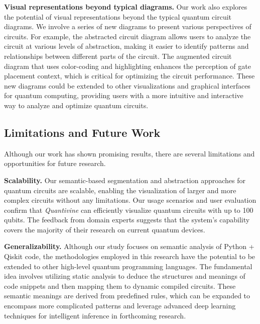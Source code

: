 \textbf{Visual representations beyond typical diagrams.}
Our work also explores the potential of visual representations beyond the typical quantum circuit diagrams.
We involve a series of new diagrams to present various perspectives of circuits.
For example, the abstracted circuit diagram allows users to analyze the circuit at various levels of abstraction, making it easier to identify patterns and relationships between different parts of the circuit.
The augmented circuit diagram that uses color-coding and highlighting enhances the perception of gate placement context, which is critical for optimizing the circuit performance.
These new diagrams could be extended to other visualizations and graphical interfaces for quantum computing, providing users with a more intuitive and interactive way to analyze and optimize quantum circuits.



\subsection{Limitations and Future Work}
\label{sec:limitation}
Although our work has shown promising results, there are several limitations and opportunities for future research.

\textbf{Scalability.}
Our semantic-based segmentation and abstraction approaches for quantum circuits are scalable, enabling the visualization of larger and more complex circuits without any limitations.
Our usage scenarios and user evaluation confirm that \emph{Quantivine} can efficiently visualize quantum circuits with up to 100 qubits.
The feedback from domain experts suggests that the system's capability covers the majority of their research on current quantum devices. 

\textbf{Generalizability.}
Although our study focuses on semantic analysis of Python + Qiskit code, the methodologies employed in this research have the potential to be extended to other high-level quantum programming languages.
The fundamental idea involves utilizing static analysis to deduce the structures and meanings of code snippets and then mapping them to dynamic compiled circuits.
These semantic meanings are derived from predefined rules, which can be expanded to encompass more complicated patterns and leverage advanced deep learning techniques for intelligent inference \cite{Wang:2023:VIS} in forthcoming research.

